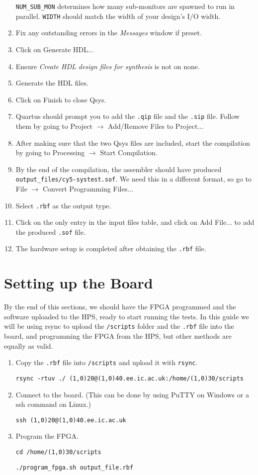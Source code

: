 \begin{enumerate}
        \texttt{NUM\_SUB\_MON} determines how many sub-monitors are spawned to run in parallel.
        \texttt{WIDTH} should match the width of your design's I/O width.
  \item Fix any outstanding errors in the \textit{Messages} window if preset.
  \item Click on Generate HDL...
  \item Ensure \textit{Create HDL design files for synthesis} is not on none.
  \item Generate the HDL files.
  \item Click on Finish to close Qsys.
  \item Quartus should prompt you to add the \texttt{.qip} file and the \texttt{.sip} file.
        Follow them by going to Project $\rightarrow$ Add/Remove Files to Project...
  \item After making sure that the two Qsys files are included, start the compilation by going to Processing $\rightarrow$ Start Compilation.
  \item By the end of the compilation, the assembler should have produced \texttt{output\_files/cy5-systest.sof}.
        We need this in a different format, so go to File $\rightarrow$ Convert Programming Files...
  \item Select \texttt{.rbf} as the output type.
  \item Click on the only entry in the input files table, and click on Add File... to add the produced \texttt{.sof} file.
  \item The hardware setup is completed after obtaining the \texttt{.rbf} file.
\end{enumerate}

\section{Setting up the Board}
By the end of this sections, we should have the FPGA programmed and the software uploaded to the HPS, ready to start running the tests.
In this guide we will be using rsync to upload the \texttt{/scripts} folder and the \texttt{.rbf} file into the board, and programming the FPGA from the HPS, but other methods are equally as valid.

\begin{enumerate}
  \item Copy the \texttt{.rbf} file into \texttt{/scripts} and upload it with \texttt{rsync}.

  \texttt{rsync -rtuv ./ \line(1,0){20}@\line(1,0){40}.ee.ic.ac.uk:/home/\line(1,0){30}/scripts}
  \item Connect to the board.
        (This can be done by using PuTTY on Windows or a ssh command on Linux.)

  \texttt{ssh \line(1,0){20}@\line(1,0){40}.ee.ic.ac.uk}
  \item Program the FPGA.

  \texttt{cd /home/\line(1,0){30}/scripts}

  \texttt{./program\_fpga.sh output\_file.rbf}
\end{enumerate}


